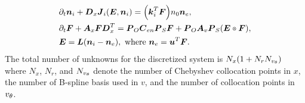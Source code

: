 \begin{subequations}
	\begin{align}
		&\partial_t \vect n_i  + \vect D_x \vect J_i \of{\vect E, \vect n_i} = \of{\vect{k}^T_i \vect F} n_0 \vect n_e \label{eq:hybrid_discrete_a},\\
		&\partial_t \vect F + \vect A_x \vect F \vect D_x^T = \vect P_{O}\vect C_{en} \vect P_{S} \vect{F}  +  \vect P_O \vect A_v \vect P_{S} \of{\vect E \pdot \vect{F}}   \label{eq:hybrid_discrete_b},\\
		&\vect{E} = \vect{L}\of{\vect n_i - \vect n_e}, \text{ where } \vect n_e = \vect u^T \vect F \label{eq:hybrid_discrete_c}.
	\end{align}\label{eq:hybrid_discrete}
\end{subequations}The total number of unknowns for the discretized system is $N_x(1 + N_{r} N_{{v_{\theta}}})$ where $N_x$, $N_r$, and $N_{{v_{\theta}}}$ denote the number of Chebyshev collocation points in $x$, the number of B-spline basis used in $v$, and the number of collocation points in ${v_{\theta}}$.



